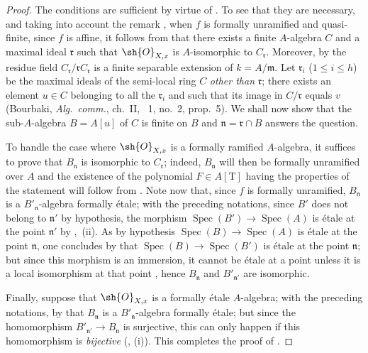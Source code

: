 \begin{proof}
The conditions are sufficient by virtue of .
To see that they are necessary, and taking into account the remark , when $f$ is formally unramified and quasi-finite, since $f$ is affine, it follows from  that there exists a finite $A$-algebra $C$ and a maximal ideal $\mathfrak{r}$ such that $\sh{O}_{X,x}$ is $A$-isomorphic to $C_\mathfrak{r}$.
Moreover, by  the residue field $C_\mathfrak{r}/\mathfrak{r}C_\mathfrak{r}$ is a finite separable extension of $k=A/\mathfrak{m}$.
Let $\mathfrak{r}_i$ ($1\leq i\leq h$) be the maximal ideals of the semi-local ring $C$ \emph{other than} $\mathfrak{r}$;
there exists an element $u\in C$ belonging to all the $\mathfrak{r}_i$ and such that its image in $C/\mathfrak{r}$ equals $v$ (Bourbaki, \emph{Alg.\ comm.}, ch.~II, \textsection~1, no.~2, prop.~5).
We shall now show that the sub-$A$-algebra $B=A[u]$ of $C$ is finite on $B$ and $\mathfrak{n}=\mathfrak{r}\cap B$ answers the question.

To handle the case where $\sh{O}_{X,x}$ is a formally ramified $A$-algebra, it suffices to prove that $B_\mathfrak{n}$ is isomorphic to $C_\mathfrak{r}$;
indeed, $B_\mathfrak{n}$ will then be formally unramified over $A$ and the existence of the polynomial $F\in A[\mathrm{T}]$ having the properties of the statement will follow from .
Note now that, since $f$ is formally unramified, $B_\mathfrak{n}$ is a $B'_\mathfrak{n}$-algebra formally \'etale;
with the preceding notations, since $B'$ does not belong to $\mathfrak{n}'$ by hypothesis, the morphism $\operatorname{Spec}(B')\to\operatorname{Spec}(A)$ is \'etale at the point $\mathfrak{n}'$ by ,~(ii).
As by hypothesis $\operatorname{Spec}(B)\to\operatorname{Spec}(A)$ is \'etale at the point $\mathfrak{n}$, one concludes by  that $\operatorname{Spec}(B)\to\operatorname{Spec}(B')$ is \'etale at the point $\mathfrak{n}$;
but since this morphism is an immersion, it cannot be \'etale at a point unless it is a local isomorphism at that point , hence $B_\mathfrak{n}$ and $B'_{\mathfrak{n}'}$ are isomorphic.

Finally, suppose that $\sh{O}_{X,x}$ is a formally \'etale $A$-algebra;
with the preceding notations, by  that $B_\mathfrak{n}$ is a $B'_\mathfrak{n}$-algebra formally \'etale;
but since the homomorphism $B'_{\mathfrak{n}'}\to B_\mathfrak{n}$ is surjective, this can only happen if this homomorphism is \emph{bijective} (, (i)).
This completes the proof of .
\end{proof}

